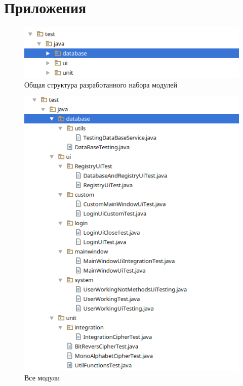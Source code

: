 \documentclass[a4paper,12pt]{article}
\begin{document}
\newpage\section*{Приложения}

\begin{center}
	\begin{figure}[h!]
		\centering
		\includegraphics[scale=0.7]{img/struct1.png}
		\caption{Общая структура разработанного набора модулей}
		\label{fig:struct1}
	\end{figure}
\end{center}

\begin{center}
	\begin{figure}[h!]
		\centering
		\includegraphics[scale=0.7]{img/struct2.png}
		\caption{Все модули}
		\label{fig:struct2}
	\end{figure}
\end{center}
\end{document}
